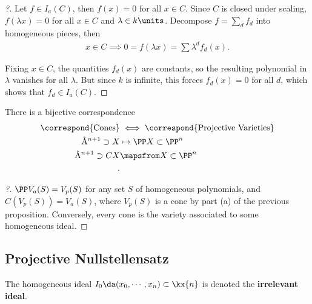 \begin{proof}[?]

Let \(f\in I_a(C)\), then \(f(x) = 0\) for all \(x\in C\). Since \(C\)
is closed under scaling, \(f(\lambda x) = 0\) for all \(x\in C\) and
\(\lambda \in k\units\). Decompose \(f = \sum_d f_d\) into homogeneous
pieces, then
\begin{align*}  
x\in C \implies 0 = f(\lambda x) = \sum \lambda^d f_d(x) 
.\end{align*}

Fixing \(x\in C\), the quantities \(f_d(x)\) are constants, so the
resulting polynomial in \(\lambda\) vanishes for all \(\lambda\). But
since \(k\) is infinite, this forces \(f_d(x) = 0\) for all \(d\), which
shows that \(f_d \in I_a(C)\).

\end{proof}

\begin{lemma}[?]

There is a bijective correspondence
\begin{align*}  
\correspond{\text{Cones}} 
&\iff
\correspond{\text{Projective Varieties}} \\
\AA^{n+1} \supset X &\mapsto \PP X\subset \PP^n \\
\AA^{n+1} \supset CX &\mapsfrom X\subset \PP^n \\
.\end{align*}

\end{lemma}

\begin{proof}[?]

\(\PP V_a(S) = V_p(S)\) for any set \(S\) of homogeneous polynomials,
and \(C(V_p(S)) = V_a(S)\), where \(V_p(S)\) is a cone by part (a) of
the previous proposition. Conversely, every cone is the variety
associated to some homogeneous ideal.

\end{proof}

\hypertarget{projective-nullstellensatz}{%
\subsection{Projective
Nullstellensatz}\label{projective-nullstellensatz}}

\begin{definition}

The homogeneous ideal \(I_0 \da (x_0, \cdots, x_n) \subset \kx{n}\) is
denoted the \textbf{irrelevant ideal}.

\end{definition}

